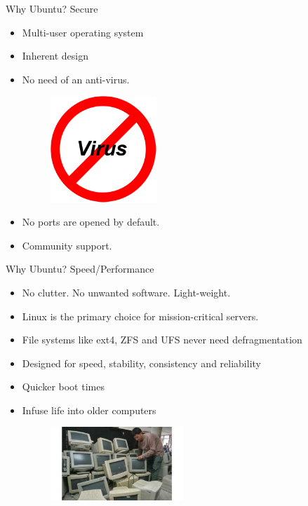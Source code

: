 \documentclass{beamer}
\begin{document}
 \begin{frame}{Why Ubuntu?}
  Secure
  \begin{itemize}
   \pause
   \item Multi-user operating system
   \pause
   \item Inherent design
   \pause
   \item No need of an anti-virus.
   \begin{figure}
    \includegraphics[width=4cm]{Images/novirus}
   \end{figure}
   \pause
   \item No ports are opened by default.
   \pause
   \item Community support.
  \end{itemize}
 \end{frame}

 \begin{frame}{Why Ubuntu?}
  Speed/Performance
  \begin{itemize}
   \pause
   \item No clutter. No unwanted software. Light-weight.
   \pause
   \item Linux is the primary choice for mission-critical servers.
   \pause
   \item File systems like ext4, ZFS and UFS never need defragmentation
   \pause
   \item Designed for speed, stability, consistency and reliability
   \pause
   \item Quicker boot times
   \pause
   \item Infuse life into older computers
    \begin{figure}
     \includegraphics[width=5cm]{Images/old_desktop_computers}
    \end{figure}
  \end{itemize}
 \end{frame}
 
\end{document}
